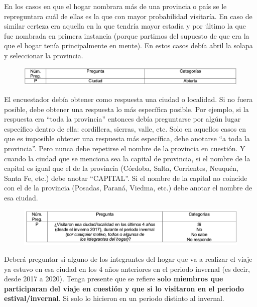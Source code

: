 \documentclass[
  openany]{book}
\begin{document}
En los casos en que el hogar nombrara más de una provincia o país se le repreguntara cuál de ellas es la que con mayor probabilidad visitaría. En caso de similar certeza era aquella en la que tendría mayor estadía y por último la que fue nombrada en primera instancia (porque partimos del supuesto de que era la que el hogar tenía principalmente en mente). En estos casos debía abril la solapa y seleccionar la provincia.

\begin{figure}

{\centering \includegraphics[width=1\linewidth]{imagenes/figura6-309} 

}

\end{figure}

El encuestador debía obtener como respuesta una ciudad o localidad. Si no fuera posible, debe obtener una respuesta lo más específica posible. Por ejemplo, si la respuesta era ``toda la provincia'' entonces debía preguntarse por algún lugar específico dentro de ella: cordillera, sierras, valle, etc. Solo en aquellos casos en que es imposible obtener una respuesta más específica, debe anotarse ``a toda la provincia''. Pero nunca debe repetirse el nombre de la provincia en cuestión. Y cuando la ciudad que se menciona sea la capital de provincia, si el nombre de la capital es igual que el de la provincia (Córdoba, Salta, Corrientes, Neuquén, Santa Fe, etc.) debe anotar ``CAPITAL''. Si el nombre de la capital no coincide con el de la provincia (Posadas, Paraná, Viedma, etc.) debe anotar el nombre de esa ciudad.

\begin{figure}

{\centering \includegraphics[width=1\linewidth]{imagenes/figura6-310} 

}

\end{figure}

Deberá preguntar si alguno de los integrantes del hogar que va a realizar el viaje ya estuvo en esa ciudad en los 4 años anteriores en el periodo invernal (es decir, desde 2017 a 2020). Tenga presente que se refiere \textbf{solo miembros que participaran del viaje en cuestión y que si lo visitaron en el periodo estival/invernal}. Si solo lo hicieron en un periodo distinto al invernal.
\end{document}
